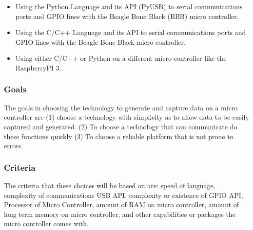 \documentclass[10pt,draftclsnofoot,onecolumn,retainorgcmds]{IEEEtran}
\begin{document}
\begin{itemize}
	\item Using the Python Language and its API (PyUSB) to serial communications ports and GPIO lines with the Beagle Bone Black (BBB) micro controller.
	\item Using the C/C++ Language and its API to serial communications ports and GPIO lines with the Beagle Bone Black micro controller.
	\item Using either C/C++ or Python on a different micro controller like the RaspberryPI 3.\\
\end{itemize}

\subsubsection{Goals}
The goals in choosing the technology to generate and capture data on a micro controller are (1) choose a technology with simplicity as to allow data to be easily captured and generated. (2) To choose a technology that can communicate do these functions quickly (3) To choose a reliable platform that is not prone to errors. \\
\subsubsection{Criteria}
The criteria that these choices will be based on are: speed of language, complexity of communications USB API, complexity or existence of GPIO API, Processor of Micro Controller, amount of RAM on micro controller, amount of long term memory on micro controller, and other capabilities or packages the micro controller comes with.\\
\end{document}
